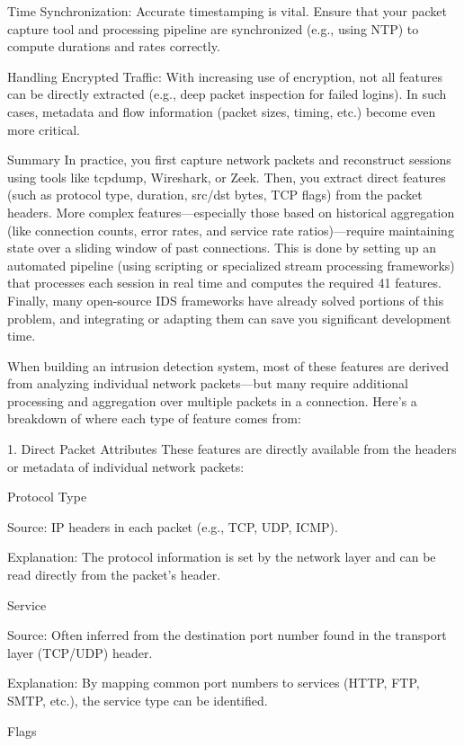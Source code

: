 \documentclass{article}
\begin{document}
Time Synchronization:
Accurate timestamping is vital. Ensure that your packet capture tool and processing pipeline are synchronized (e.g., using NTP) to compute durations and rates correctly.

Handling Encrypted Traffic:
With increasing use of encryption, not all features can be directly extracted (e.g., deep packet inspection for failed logins). In such cases, metadata and flow information (packet sizes, timing, etc.) become even more critical.

Summary
In practice, you first capture network packets and reconstruct sessions using tools like tcpdump, Wireshark, or Zeek. Then, you extract direct features (such as protocol type, duration, src/dst bytes, TCP flags) from the packet headers. More complex features—especially those based on historical aggregation (like connection counts, error rates, and service rate ratios)—require maintaining state over a sliding window of past connections. This is done by setting up an automated pipeline (using scripting or specialized stream processing frameworks) that processes each session in real time and computes the required 41 features. Finally, many open-source IDS frameworks have already solved portions of this problem, and integrating or adapting them can save you significant development time.



When building an intrusion detection system, most of these features are derived from analyzing individual network packets—but many require additional processing and aggregation over multiple packets in a connection. Here’s a breakdown of where each type of feature comes from:

1. Direct Packet Attributes
These features are directly available from the headers or metadata of individual network packets:

Protocol Type

Source: IP headers in each packet (e.g., TCP, UDP, ICMP).

Explanation: The protocol information is set by the network layer and can be read directly from the packet's header.

Service

Source: Often inferred from the destination port number found in the transport layer (TCP/UDP) header.

Explanation: By mapping common port numbers to services (HTTP, FTP, SMTP, etc.), the service type can be identified.

Flags
\end{document}
